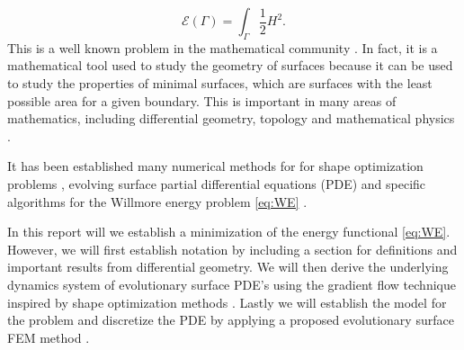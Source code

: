 \begin{equation}
\label{eq:WE}
\mathcal{E} \left( \Gamma  \right) = \int_{\Gamma }^{} \frac{1}{2} H ^2
.\end{equation}
This is a well known problem in the mathematical community \cite{ topping2000towards, marques2014willmore,link2013gradient}. In fact, it is a mathematical tool used to study the geometry of surfaces because it can be used to study the properties of minimal surfaces, which are surfaces with the least possible area for a given boundary. This is important in many areas of mathematics, including differential geometry, topology and mathematical physics \cite{koerber2021area,jakob2022singularities, rupp21}.



It has been established many numerical methods for for shape optimization problems \cite{sokolowski1992introduction,ito2008variational}, evolving surface partial differential equations (PDE) \cite{dziuk2013finite,dziuk2007finite,
binz2022convergent,barrett2007parametric, barrett2007variational} and specific
algorithms for the Willmore energy problem \eqref{eq:WE}  \cite{palmurella2022parametric, dziuk2008computational, bonito2010parametric,  kovacs2021convergent, hu2022evolving}.

In this report will we establish a minimization of the energy functional \eqref{eq:WE}. However, we will first establish notation by including a section for definitions and important results from differential geometry. We will then derive the
underlying dynamics system of evolutionary surface PDE's \cite{dougan2012first} using the gradient flow technique inspired by shape optimization methods \cite{ito2008variational}. Lastly we will establish the model for the problem and discretize the
PDE by applying a proposed evolutionary surface FEM method \cite{kovacs2021convergent}.



